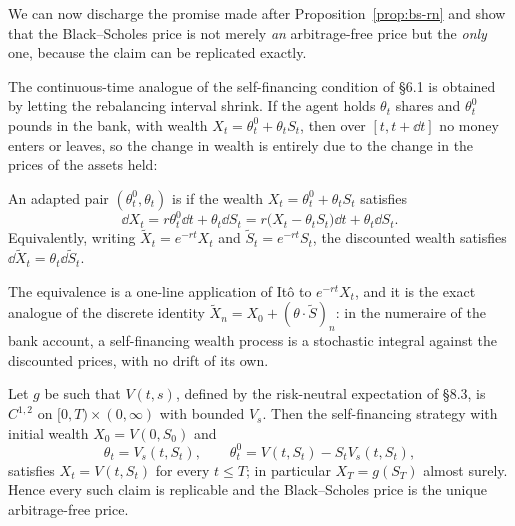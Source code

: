We can now discharge the promise made after Proposition~\ref{prop:bs-rn} and show that the Black--Scholes price is not merely \emph{an} arbitrage-free price but the \emph{only} one, because the claim can be replicated exactly.

The continuous-time analogue of the self-financing condition of \S6.1 is obtained by letting the rebalancing interval shrink. If the agent holds $\theta_t$ shares and $\theta^0_t$ pounds in the bank, with wealth $X_t = \theta^0_t + \theta_tS_t$, then over $[t, t+\dd t]$ no money enters or leaves, so the change in wealth is entirely due to the change in the prices of the assets held:

\begin{definition}
	An adapted pair $(\theta^0_t,\theta_t)$ is  if the wealth $X_t = \theta_t^0 + \theta_tS_t$ satisfies
	$$
	\dd X_t = r\theta^0_t\dd t + \theta_t\dd S_t = r\big(X_t - \theta_tS_t\big)\dd t + \theta_t\dd S_t.
	$$
	Equivalently, writing $\tilde X_t = e^{-rt}X_t$ and $\tilde S_t = e^{-rt}S_t$, the discounted wealth satisfies $\dd\tilde X_t = \theta_t\dd\tilde S_t$.
\end{definition}

The equivalence is a one-line application of It\^o to $e^{-rt}X_t$, and it is the exact analogue of the discrete identity $\tilde X_n = X_0 + (\theta\cdot\tilde S)_n$: in the numeraire of the bank account, a self-financing wealth process is a stochastic integral against the discounted prices, with no drift of its own.

\begin{theorem}\label{thm:bs-complete}
	Let $g$ be such that $V(t,s)$, defined by the risk-neutral expectation of \S8.3, is $C^{1,2}$ on $[0,T)\times(0,\infty)$ with bounded $V_s$. Then the self-financing strategy with initial wealth $X_0 = V(0,S_0)$ and
	$$
	\theta_t = V_s(t,S_t), \qquad \theta^0_t = V(t,S_t) - S_tV_s(t,S_t),
	$$
	satisfies $X_t = V(t,S_t)$ for every $t\leq T$; in particular $X_T = g(S_T)$ almost surely. Hence every such claim is replicable and the Black--Scholes price is the unique arbitrage-free price.
\end{theorem}

